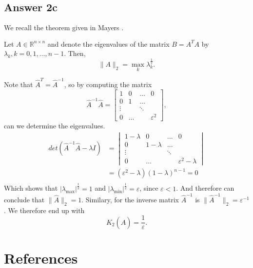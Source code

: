 \documentclass{article}
\theoremstyle{remark}
\begin{document}
\subsection{Answer 2c}%
\label{sub:answer_c}
 We recall the theorem given in Mayers \cite{sul}. 
\begin{theorem}
  Let $ A \in  \mathbb{R} ^{n \times n }$ and denote the eigenvalues of the matrix $B = A^{T} A$ by $\lambda _{k}, k = 0,1,\ldots,n-1$. Then, \[
    \|A\|_{2}^{} = \max_{k }  \lambda _{k} ^{\frac{1}{2}}.
  \] 
\end{theorem}
Note that $\hat{A}^{T} = \hat{A}^{-1}$, so by computing the matrix \[
\hat{A}^{-1} \hat{A} = \begin{bmatrix} 
1  & 0  &  \ldots  &  0 \\
0   &  1  &  \ldots  \\
\vdots   &   &  \ddots   &  \\
0  &  \ldots  &   &   \varepsilon ^{2} 
\end{bmatrix} ,
\] 
 can we determine the eigenvalues.\[
   \begin{split}
det \left(  \hat{A}^{-1} \hat{A} - \lambda I \right)  &= 
\begin{vmatrix} 
1- \lambda   & 0  &  \ldots  &  0 \\
0   &  1 - \lambda   &  \ldots  \\
\vdots   &   &  \ddots   &  \\
0  &  \ldots  &   &   \varepsilon ^2  - \lambda  
\end{vmatrix}  \\
   &=  \left( \varepsilon ^2 - \lambda  \right) \left( 1- \lambda  \right)^{n-1} = 0 \\
   \end{split}  
 \] 
 Which shows that $\left\lvert \lambda_{\text{max}}  \right\rvert^{\frac{1}{2}}   = 1  $ and $\left\lvert \lambda_{\text{min}}  \right\rvert^{\frac{1}{2}}   = \varepsilon   $, since $\varepsilon   < 1$. And therefore can conclude that $\|\hat{A}\|_{2}^{} = 1 $. Similary, for the inverse matrix $\hat{A}^{-1}$ is $\|\hat{A}^{-1}\|_{2}^{} = \varepsilon ^{-1} $. 
 We therefore end up with \[
 K_{2}\left( \hat{A} \right) = \frac{1}{\varepsilon } .
 \] 


\newpage
\section{References}%
\label{sec:references}


\end{document}
